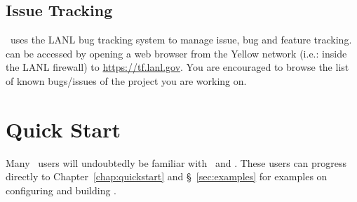 \subsection{Issue Tracking}
\draco\ uses the LANL  bug tracking system to manage issue, bug and feature tracking.  can be accessed by opening a web browser from the Yellow network (i.e.: inside the LANL firewall) to \url{https://tf.lanl.gov}. You are encouraged to browse the list of known bugs/issues of the project you are working on.


\section{Quick Start}
\label{sec:quick}

Many \draco\ users will undoubtedly be familiar with \cmake\ and \make. These users can progress directly to Chapter~\ref{chap:quickstart} and \S~\ref{sec:examples} for 
examples on configuring and building \draco. 

